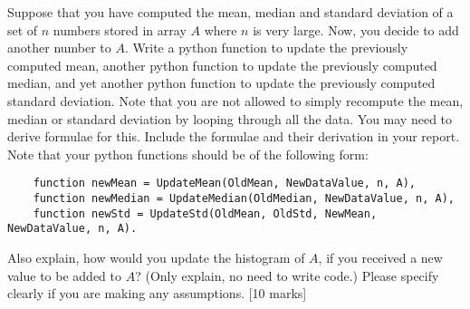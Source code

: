 \begin{que}
	Suppose that you have computed the mean, median and standard deviation of a
	set of $n$ numbers stored in array $A$ where $n$ is very large. Now, you decide
	to add another number to $A$. Write a python function to update the
	previously computed mean, another python function to update the previously
	computed median, and yet another python function to update the previously
	computed standard deviation. Note that you are not allowed to simply
	recompute the mean, median or standard deviation by looping through all the
	data. You may need to derive formulae for this. Include the formulae and
	their derivation in your report. Note that your python functions should be
	of the following form:

	\begin{verbatim}
	function newMean = UpdateMean(OldMean, NewDataValue, n, A),
	function newMedian = UpdateMedian(OldMedian, NewDataValue, n, A),
	function newStd = UpdateStd(OldMean, OldStd, NewMean, NewDataValue, n, A).
	\end{verbatim}

	Also explain, how would you update the histogram of $A$, if you received
	a new value to be added to $A$? (Only explain, no need to write code.)
	Please specify clearly if you are making any assumptions.
	\hspace*{\fill}[10 marks]
\end{que}

\begin{tcolorbox}
	\begin{sol}
	\end{sol}
\end{tcolorbox}
